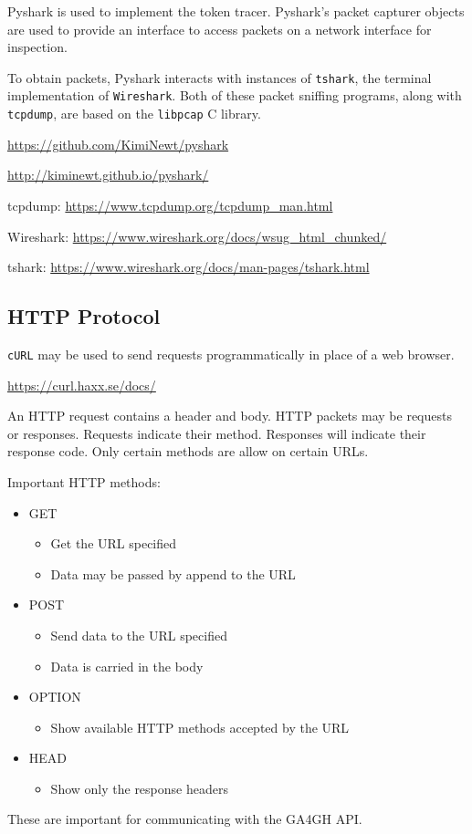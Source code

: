 \documentclass{article}
\begin{document}
Pyshark is used to implement the token tracer. Pyshark's
packet capturer objects are used to provide an interface 
to access packets on a network interface for inspection.

To obtain packets, Pyshark interacts with instances of \texttt{tshark}, 
the terminal implementation of \texttt{Wireshark}. Both of these 
packet sniffing programs, along with \texttt{tcpdump}, are
based on the \texttt{libpcap} C library.

\url{https://github.com/KimiNewt/pyshark}

\url{http://kiminewt.github.io/pyshark/}

tcpdump: \url{https://www.tcpdump.org/tcpdump_man.html}

Wireshark: \url{https://www.wireshark.org/docs/wsug_html_chunked/}

tshark: \url{https://www.wireshark.org/docs/man-pages/tshark.html}

\subsection{HTTP Protocol}

\texttt{cURL} may be used to send requests programmatically in place of a web browser.

\url{https://curl.haxx.se/docs/}

An HTTP request contains a header and body. HTTP packets may be requests or responses. Requests indicate their method. Responses will indicate their response code. Only certain methods are allow on certain URLs.

Important HTTP methods:
\begin{itemize}
\item GET
\begin{itemize}
\item Get the URL specified
\item Data may be passed by append to the URL
\end{itemize}
\item POST
\begin{itemize}
\item Send data to the URL specified
\item Data is carried in the body
\end{itemize}
\item OPTION
\begin{itemize}
\item Show available HTTP methods accepted by the URL
\end{itemize}
\item HEAD
\begin{itemize}
\item Show only the response headers
\end{itemize}
\end{itemize}
These are important for communicating with the GA4GH API.
\end{document}

